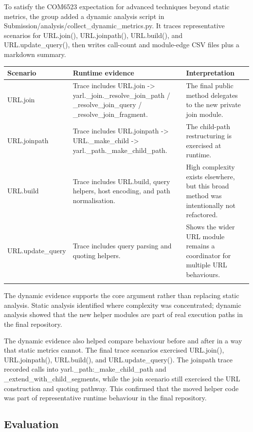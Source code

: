 \documentclass[11pt,a4paper]{article}
\begin{document}
To satisfy the COM6523 expectation for advanced techniques beyond static metrics, the group added a dynamic analysis script in Submission/analysis/collect\_dynamic\_metrics.py. It traces representative scenarios for URL.join(), URL.joinpath(), URL.build(), and URL.update\_query(), then writes call-count and module-edge CSV files plus a markdown summary.


\begin{longtable}{p{} p{} p{}}
\toprule
Scenario & Runtime evidence & Interpretation \\
\midrule
URL.join & Trace includes URL.join -> yarl.\_join.\_resolve\_join\_path / \_resolve\_join\_query / \_resolve\_join\_fragment. & The final public method delegates to the new private join module. \\
\addlinespace
URL.joinpath & Trace includes URL.joinpath -> URL.\_make\_child -> yarl.\_path.\_make\_child\_path. & The child-path restructuring is exercised at runtime. \\
\addlinespace
URL.build & Trace includes URL.build, query helpers, host encoding, and path normalisation. & High complexity exists elsewhere, but this broad method was intentionally not refactored. \\
\addlinespace
URL.update\_query & Trace includes query parsing and quoting helpers. & Shows the wider URL module remains a coordinator for multiple URL behaviours. \\
\addlinespace
\bottomrule
\end{longtable}


The dynamic evidence supports the core argument rather than replacing static analysis. Static analysis identified where complexity was concentrated; dynamic analysis showed that the new helper modules are part of real execution paths in the final repository.


The dynamic evidence also helped compare behaviour before and after in a way that static metrics cannot. The final trace scenarios exercised URL.join(), URL.joinpath(), URL.build(), and URL.update\_query(). The joinpath trace recorded calls into yarl.\_path:\_make\_child\_path and \_extend\_with\_child\_segments, while the join scenario still exercised the URL construction and quoting pathway. This confirmed that the moved helper code was part of representative runtime behaviour in the final repository.


\subsection*{Evaluation}
\end{document}
